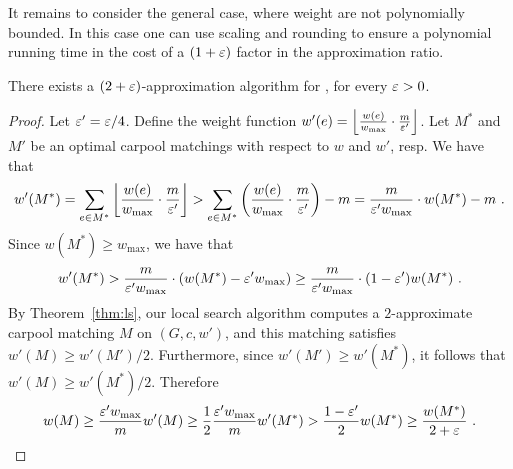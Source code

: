 It remains to consider the general case, where weight are not
polynomially bounded.  In this case one can use scaling and rounding
to ensure a polynomial running time in the cost of a $(1+\varepsilon)$ factor
in the approximation ratio.

\begin{theorem}
There exists a $(2+\varepsilon)$-approximation algorithm for \carpool, for
every $\varepsilon > 0$.
\end{theorem}
\begin{proof}
Let $\varepsilon' = \varepsilon/4$.
%
Define the weight function $w'(e)
= \left\lfloor \frac{w(e)}{w_{\max}} \cdot \frac{m}{\varepsilon'} \right\rfloor$.
%
Let $M^*$ and $M'$ be an optimal carpool matchings with respect to $w$
and $w'$, resp.  We have that
\[
w'(M^*)
=    \sum_{e \in M^*} \left\lfloor \frac{w(e)}{w_{\max}} \cdot \frac{m}{\varepsilon'} \right\rfloor
>    \sum_{e \in M^*} \left(  \frac{w(e)}{w_{\max}} \cdot \frac{m}{\varepsilon'}  \right) - m
=    \frac{m}{\varepsilon' w_{\max}} \cdot w(M^*) - m
~.
\]
Since $w(M^*) \geq w_{\max}$, we have that 
\[
w'(M^*)
>    \frac{m}{\varepsilon' w_{\max}} \cdot (w(M^*) - \varepsilon' w_{\max})
\geq \frac{m}{\varepsilon' w_{\max}} \cdot (1-\varepsilon') w(M^*)
~.
\]
By Theorem~\ref{thm:ls}, our local search algorithm computes a
$2$-approximate carpool matching $M$ on $(G, c, w')$, and this
matching satisfies $w'(M) \geq w'(M')/2$.  Furthermore, since
$w'(M') \geq w'(M^*)$, it follows that $w'(M) \geq w'(M^*)/2$.
Therefore
\[
w(M)
\geq \frac{\varepsilon' w_{\max}}{m} w'(M) 
\geq \frac{1}{2} \frac{\varepsilon' w_{\max}}{m} w'(M^*)
>    \frac{1-\varepsilon'}{2} w(M^*)
\geq \frac{w(M^*)}{2+\varepsilon}
~.
\]
\end{proof}






